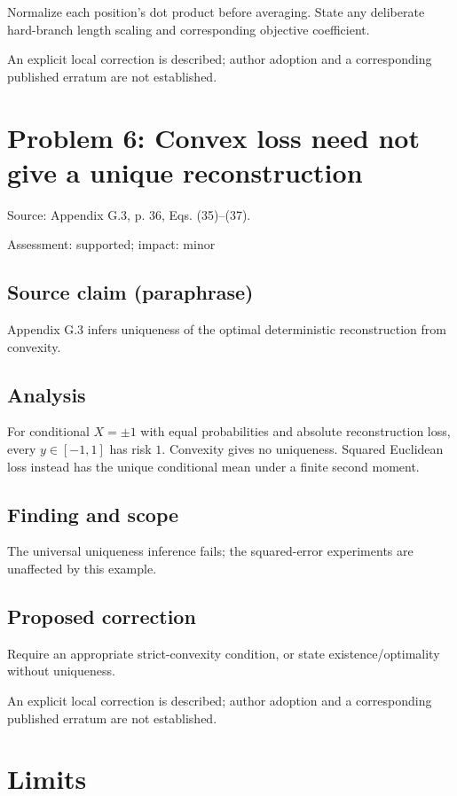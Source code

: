 \documentclass[11pt]{article}
\begin{document}
Normalize each position’s dot product before averaging. State any deliberate hard-branch length scaling and corresponding objective coefficient.

An explicit local correction is described; author adoption and a corresponding published erratum are not established.

\section*{Problem 6: Convex loss need not give a unique reconstruction}

Source: Appendix G.3, p. 36, Eqs. (35)–(37).

Assessment: supported; impact: minor

\subsection*{Source claim (paraphrase)}

Appendix G.3 infers uniqueness of the optimal deterministic reconstruction from convexity.

\subsection*{Analysis}

For conditional \(X=\pm1\) with equal probabilities and absolute reconstruction loss, every \(y\in[-1,1]\) has risk \(1\). Convexity gives no uniqueness. Squared Euclidean loss instead has the unique conditional mean under a finite second moment.

\subsection*{Finding and scope}

The universal uniqueness inference fails; the squared-error experiments are unaffected by this example.

\subsection*{Proposed correction}

Require an appropriate strict-convexity condition, or state existence/optimality without uniqueness.

An explicit local correction is described; author adoption and a corresponding published erratum are not established.

\section*{Limits}
\end{document}
